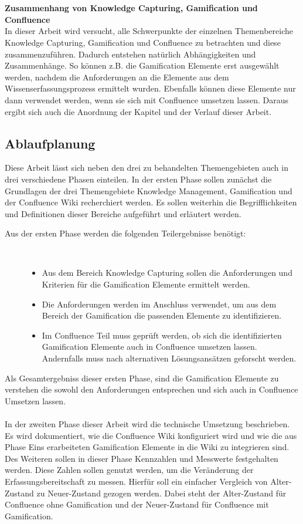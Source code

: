 \documentclass[a4paper,12pt,twoside]{scrartcl}
\begin{document}
\\\\
\textbf{Zusammenhang von Knowledge Capturing, Gamification und Confluence}\\
In dieser Arbeit wird versucht, alle Schwerpunkte der einzelnen Themenbereiche Knowledge Capturing, Gamification und Confluence zu betrachten und diese zusammenzuführen. Dadurch entstehen natürlich Abhängigkeiten und Zusammenhänge. So können z.B. die Gamification Elemente erst ausgewählt werden, nachdem die Anforderungen an die Elemente aus dem Wissenserfassungsprozess ermittelt wurden. Ebenfalls können diese Elemente nur dann verwendet werden, wenn sie sich mit Confluence umsetzen lassen. Daraus ergibt sich auch die Anordnung der Kapitel und der Verlauf dieser Arbeit.
\subsection{Ablaufplanung}
Diese Arbeit lässt sich neben den drei zu behandelten Themengebieten auch in drei verschiedene Phasen einteilen. In der ersten Phase sollen zunächst die Grundlagen der drei Themengebiete Knowledge Management, Gamification und der Confluence Wiki recherchiert werden. Es sollen weiterhin die Begrifflichkeiten und Definitionen dieser Bereiche aufgeführt und erläutert werden. 
\begin{description}
   \item[Aus der ersten Phase werden die folgenden Teilergebnisse benötigt:]~\par
   \begin{itemize}
      \item Aus dem Bereich Knowledge Capturing sollen die Anforderungen und Kriterien für die Gamification Elemente ermittelt werden.
      \item Die Anforderungen werden im Anschluss verwendet, um aus dem Bereich der Gamification die passenden Elemente zu identifizieren.
      \item Im Confluence Teil muss geprüft werden, ob sich die identifizierten Gamification Elemente auch in Confluence umsetzen lassen. Andernfalls muss nach alternativen Lösungsansätzen geforscht werden.
   \end{itemize}
\end{description}
Als Gesamtergebniss dieser ersten Phase, sind die Gamification Elemente zu verstehen die sowohl den Anforderungen entsprechen und sich auch in Confluence Umsetzen lassen.
\\\\
In der zweiten Phase dieser Arbeit wird die technische Umsetzung beschrieben. Es wird dokumentiert, wie die Confluence Wiki konfiguriert wird und wie die aus Phase Eins erarbeiteten Gamification Elemente in die Wiki zu integrieren sind. Des Weiteren sollen in dieser Phase Kennzahlen und Messwerte festgehalten werden. Diese Zahlen sollen genutzt werden, um die Veränderung der Erfassungsbereitschaft zu messen. Hierfür soll ein einfacher Vergleich von Alter-Zustand zu Neuer-Zustand gezogen werden. Dabei steht der Alter-Zustand für Confluence ohne Gamification und der Neuer-Zustand für Confluence mit Gamification.
\end{document}
